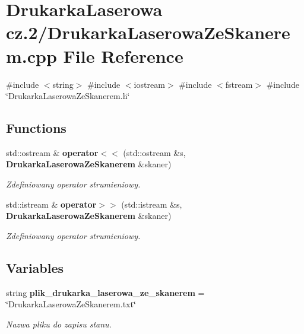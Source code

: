 \section{Drukarka\+Laserowa cz.2/\+Drukarka\+Laserowa\+Ze\+Skanerem.cpp File Reference}
\label{_drukarka_laserowa_ze_skanerem_8cpp}
{\ttfamily \#include $<$string$>$}\newline
{\ttfamily \#include $<$iostream$>$}\newline
{\ttfamily \#include $<$fstream$>$}\newline
{\ttfamily \#include \char`\"{}Drukarka\+Laserowa\+Ze\+Skanerem.\+h\char`\"{}}\newline
\subsection*{Functions}
\begin{DoxyCompactItemize}
\item 
std\+::ostream \& \textbf{ operator$<$$<$} (std\+::ostream \&s, \textbf{ Drukarka\+Laserowa\+Ze\+Skanerem} \&skaner)
\begin{DoxyCompactList}\small\item\em Zdefiniowany operator strumieniowy. \end{DoxyCompactList}\item 
std\+::istream \& \textbf{ operator$>$$>$} (std\+::istream \&s, \textbf{ Drukarka\+Laserowa\+Ze\+Skanerem} \&skaner)
\begin{DoxyCompactList}\small\item\em Zdefiniowany operator strumieniowy. \end{DoxyCompactList}\end{DoxyCompactItemize}
\subsection*{Variables}
\begin{DoxyCompactItemize}
\item 
string \textbf{ plik\+\_\+drukarka\+\_\+laserowa\+\_\+ze\+\_\+skanerem} = \char`\"{}Drukarka\+Laserowa\+Ze\+Skanerem.\+txt\char`\"{}
\begin{DoxyCompactList}\small\item\em Nazwa pliku do zapisu stanu. \end{DoxyCompactList}\end{DoxyCompactItemize}


